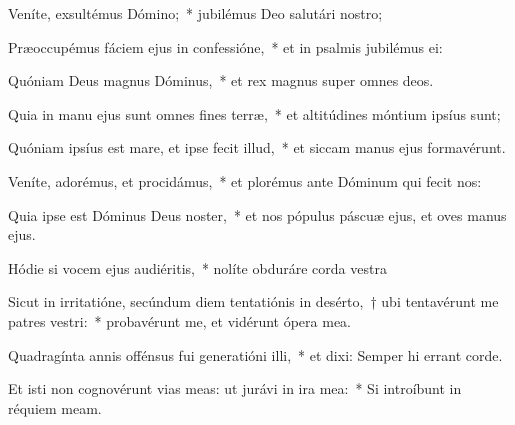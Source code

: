 \item Veníte, exsultémus Dómino;~* jubilémus Deo salutári nostro;

\item Præoccupémus fáciem ejus in confessióne,~* et in psalmis jubilémus ei: 

\item Quóniam Deus magnus Dóminus,~* et rex magnus super omnes deos.

\item Quia in manu ejus sunt omnes fines terræ,~* et altitúdines móntium ipsíus sunt; 

\item Quóniam ipsíus est mare, et ipse fecit illud,~* et siccam manus ejus formavérunt.

\item Veníte, adorémus, et procidámus,~* et plorémus ante Dóminum qui fecit nos:

\item Quia ipse est Dóminus Deus noster,~* et nos pópulus páscuæ ejus, et oves manus ejus. 

\item Hódie si vocem ejus audiéritis,~* nolíte obduráre corda vestra

\item Sicut in irritatióne, secúndum diem tentatiónis in desérto,~† ubi tentavérunt me patres vestri:~* probavérunt me, et vidérunt ópera mea. 

\item Quadragínta annis offénsus fui generatióni illi,~* et dixi: Semper hi errant corde.

\item Et isti non cognovérunt vias meas: ut jurávi in ira mea:~* Si introíbunt in réquiem meam. 

